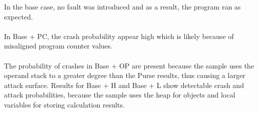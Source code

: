 In the base case, no fault was introduced and as a result, the program ran as expected.\\\\
%
In Base + PC, the crash probability appear high which is likely because of misaligned program counter values.~\\\\
%
The probability of crashes in Base + OP are present because the sample uses the operand stack to a greater degree than the \jc Purse results, thus causing a larger attack surface.
%
Results for Base + H and Base + L show detectable crash and attack probabilities, because the sample uses the heap for objects and local variables for storing calculation results.